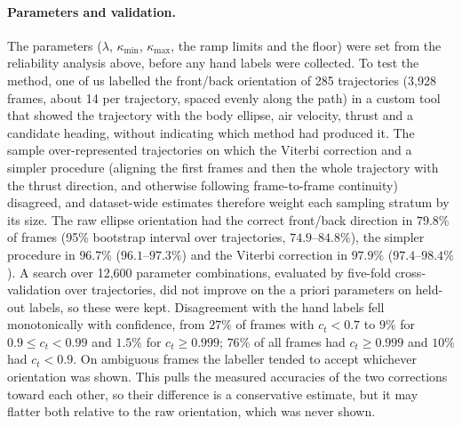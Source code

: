 \paragraph{Parameters and validation.}
The parameters ($\lambda$, $\kappa_{\min}$, $\kappa_{\max}$, the ramp limits and the floor) were set from the
reliability analysis above, before any hand labels were collected. To test the method, one of us labelled
the front/back orientation of 285 trajectories (3{,}928 frames, about 14 per trajectory, spaced evenly along the
path) in a custom tool that showed the trajectory with the body ellipse, air velocity, thrust and a candidate
heading, without indicating which method had produced it. The sample over-represented trajectories on which the
Viterbi correction and a simpler procedure (aligning the first frames and then the whole trajectory with the
thrust direction, and otherwise following frame-to-frame continuity) disagreed, and
dataset-wide estimates therefore weight each sampling stratum by its size. The raw ellipse orientation had the
correct front/back direction in $79.8\%$ of frames (95\% bootstrap interval over trajectories, $74.9$--$84.8\%$),
the simpler procedure in $96.7\%$ ($96.1$--$97.3\%$) and the Viterbi correction in $97.9\%$ ($97.4$--$98.4\%$).
A search over 12{,}600 parameter combinations, evaluated by five-fold cross-validation over trajectories, did not
improve on the a priori parameters on held-out labels, so these were kept. Disagreement with the hand labels fell
monotonically with confidence, from $27\%$ of frames with $c_t < 0.7$ to $9\%$ for $0.9 \le c_t < 0.99$ and $1.5\%$ for
$c_t \ge 0.999$; $76\%$ of all frames had $c_t \ge 0.999$ and $10\%$ had $c_t < 0.9$. On ambiguous frames the
labeller tended to accept whichever orientation was shown. This pulls the measured accuracies of the two
corrections toward each other, so their difference is a conservative estimate, but it may flatter both relative
to the raw orientation, which was never shown.

